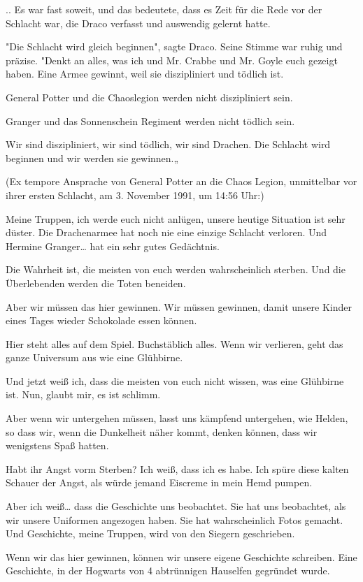 {.. Es war fast soweit, und das bedeutete, dass es Zeit für die Rede vor der Schlacht war, die Draco verfasst und auswendig gelernt hatte.

"Die Schlacht wird gleich beginnen", sagte Draco. Seine Stimme war ruhig und präzise. "Denkt an alles, was ich und Mr. Crabbe und Mr. Goyle euch gezeigt haben. Eine Armee gewinnt, weil sie diszipliniert und tödlich ist.

General Potter und die Chaoslegion werden nicht diszipliniert sein.

Granger und das Sonnenschein Regiment werden nicht tödlich sein.

Wir sind diszipliniert, wir sind tödlich, wir sind Drachen. Die Schlacht wird beginnen und wir werden sie gewinnen.„

(Ex tempore Ansprache von General Potter an die Chaos Legion, unmittelbar vor ihrer ersten Schlacht, am 3. November 1991, um 14:56 Uhr:)

Meine Truppen, ich werde euch nicht anlügen, unsere heutige Situation ist sehr düster. Die Drachenarmee hat noch nie eine einzige Schlacht verloren. Und Hermine Granger… hat ein sehr gutes Gedächtnis.

Die Wahrheit ist, die meisten von euch werden wahrscheinlich sterben. Und die Überlebenden werden die Toten beneiden.

Aber wir müssen das hier gewinnen. Wir müssen gewinnen, damit unsere Kinder eines Tages wieder Schokolade essen können.

Hier steht alles auf dem Spiel. Buchstäblich alles. Wenn wir verlieren, geht das ganze Universum aus wie eine Glühbirne.

Und jetzt weiß ich, dass die meisten von euch nicht wissen, was eine Glühbirne ist. Nun, glaubt mir, es ist schlimm.

Aber wenn wir untergehen müssen, lasst uns kämpfend untergehen, wie Helden, so dass wir, wenn die Dunkelheit näher kommt, denken können, dass wir wenigstens Spaß hatten.

Habt ihr Angst vorm Sterben? Ich weiß, dass ich es habe. Ich spüre diese kalten Schauer der Angst, als würde jemand Eiscreme in mein Hemd pumpen.

Aber ich weiß… dass die Geschichte uns beobachtet. Sie hat uns beobachtet, als wir unsere Uniformen angezogen haben. Sie hat wahrscheinlich Fotos gemacht. Und Geschichte, meine Truppen, wird von den Siegern geschrieben.

Wenn wir das hier gewinnen, können wir unsere eigene Geschichte schreiben. Eine Geschichte, in der Hogwarts von 4 abtrünnigen Hauselfen gegründet wurde.

}
